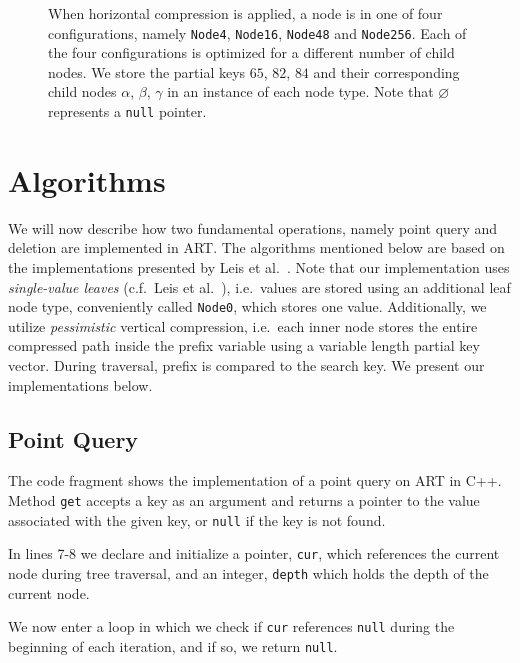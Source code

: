 \documentclass[abstracton,12pt]{scrartcl}
\theoremstyle{definition}
\begin{document}
\begin{figure}[h!]
  \vspace{-3cm}
  \caption{
    When horizontal compression is applied, a node is in one of four 
    configurations, namely \texttt{Node4}, \texttt{Node16}, \texttt{Node48} 
    and \texttt{Node256}.
    Each of the four configurations is optimized for a different number of 
    child nodes. We store the partial keys $65$, $82$, $84$ and their 
    corresponding child nodes $\alpha$, $\beta$, $\gamma$ in an instance
    of each node type. Note that $\varnothing$ represents a \texttt{null} 
    pointer.
  }
 \label{fig:horizontal-compression}
\end{figure}

\newpage

\section{Algorithms}\label{sec:algorithms}

We will now describe how two fundamental operations, namely
point query and deletion are implemented in ART.
The algorithms mentioned below are based on the implementations presented by
Leis et al.\ \cite{leis2013adaptive}. Note that our implementation uses
\textit{single-value leaves} (c.f.\ Leis et al.\ \cite{leis2013adaptive}), 
i.e.\ values are stored using an additional leaf node type, conveniently
called \texttt{Node0}, which stores one value. Additionally, we utilize
\textit{pessimistic} vertical compression, i.e.\ each inner node stores
the entire compressed path inside the prefix variable using a variable length
partial key vector. During traversal, prefix is compared to the search key.
We present our implementations below.

\subsection{Point Query}\label{sec:point-query}

The code fragment shows the implementation of a point query on ART in
C++. Method \texttt{get} accepts a key as an argument and returns a pointer
to the value associated with the given key, or \texttt{null} if the key is not found.

In lines 7-8 we declare and initialize a pointer, \texttt{cur}, which references the
current node during tree traversal, and an integer, \texttt{depth} which holds the depth
of the current node.

We now enter a loop in which we check if \texttt{cur} references \texttt{null}
during the beginning of each iteration, and if so, we return \texttt{null}.
\end{document}
